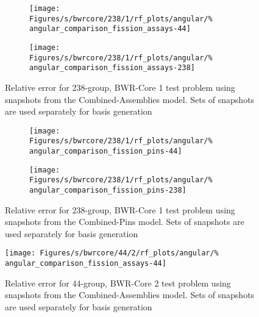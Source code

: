\begin{figure*}[tb]
    \centering
    \begin{subfigure}{0.5\textwidth}
        \centering
        \texttt{[image: Figures/s/bwrcore/238/1/rf\_plots/angular/\%
            angular\_comparison\_fission\_assays-44]}
    \end{subfigure}%
    \begin{subfigure}{0.5\textwidth}
        \centering
        \texttt{[image: Figures/s/bwrcore/238/1/rf\_plots/angular/\%
            angular\_comparison\_fission\_assays-238]}
    \end{subfigure}
    \caption{Relative error for 238-group, BWR-Core 1 test problem using 
        snapshots from the Combined-Assemblies model.  Sets of snapshots are 
        used separately for basis generation}
    \label{fig:BWR1-assay-single-238}
\end{figure*}

\begin{figure*}[tb]
    \centering
    \begin{subfigure}{0.5\textwidth}
        \centering
        \texttt{[image: Figures/s/bwrcore/238/1/rf\_plots/angular/\%
            angular\_comparison\_fission\_pins-44]}
    \end{subfigure}%
    \begin{subfigure}{0.5\textwidth}
        \centering
        \texttt{[image: Figures/s/bwrcore/238/1/rf\_plots/angular/\%
            angular\_comparison\_fission\_pins-238]}
    \end{subfigure}
    \caption{Relative error for 238-group, BWR-Core 1 test problem using 
        snapshots from the Combined-Pins model.  Sets of snapshots are 
        used separately for basis generation}
    \label{fig:BWR1-pins-single-238}
\end{figure*}

\begin{figure*}[tb]
    \centering
    \texttt{[image: Figures/s/bwrcore/44/2/rf\_plots/angular/\%
        angular\_comparison\_fission\_assays-44]}
    \caption{Relative error for 44-group, BWR-Core 2 test problem using 
        snapshots from the Combined-Assemblies model.  Sets of snapshots are 
        used separately for basis generation}
    \label{fig:BWR2-assay-single}
\end{figure*}

